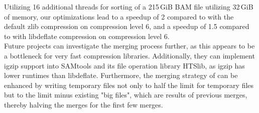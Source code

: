 Utilizing 16 additional threads for sorting of a 215\,GiB BAM file utilizing 32\,GiB of memory, our optimizations lead to a speedup of 2 compared to \sort with the default zlib compression on compression level 6, and a speedup of 1.5 compared to \sort with libdeflate compression on compression level 6.\\

Future projects can investigate the merging process further, as this appears to be a bottleneck for very fast compression libraries. Additionally, they can implement igzip support into SAMtools and its file operation library HTSlib, as igzip has lower runtimes than libdeflate. Furthermore, the merging strategy of \sort can be enhanced by writing temporary files not only to half the limit for temporary files but to the limit minus existing "big files", which are results of previous merges, thereby halving the merges for the first few merges.